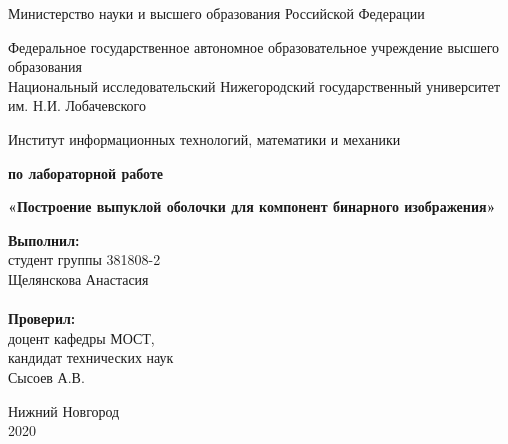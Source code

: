 \documentclass{report}
\begin{document}
\begin{titlepage}

\begin{center}
Министерство науки и высшего образования Российской Федерации
\end{center}

\begin{center}
Федеральное государственное автономное образовательное учреждение высшего образования \\
Национальный исследовательский Нижегородский государственный университет им. Н.И. Лобачевского
\end{center}

\begin{center}
Институт информационных технологий, математики и механики
\end{center}

\vspace{4em}

\begin{center}
\textbf{ по лабораторной работе} \\
\end{center}
\begin{center}
\textbf{\Large«Построение выпуклой оболочки для компонент бинарного изображения»} \\
\end{center}

\vspace{4em}

\newbox{\lbox}
\newlength{\maxl}
\setlength{\maxl}{\wd\lbox}
\hfill\parbox{7cm}{
\hspace*{5cm}\hspace*{-5cm}\textbf{Выполнил:} \\ студент группы 381808-2 \\ Щелянскова Анастасия\\
\\
\hspace*{5cm}\hspace*{-5cm}\textbf{Проверил:}\\ доцент кафедры МОСТ, \\ кандидат технических наук \\ Сысоев А.В.\\
}
\vspace{\fill}

\begin{center} Нижний Новгород \\ 2020 \end{center}

\end{titlepage}
\end{document}

